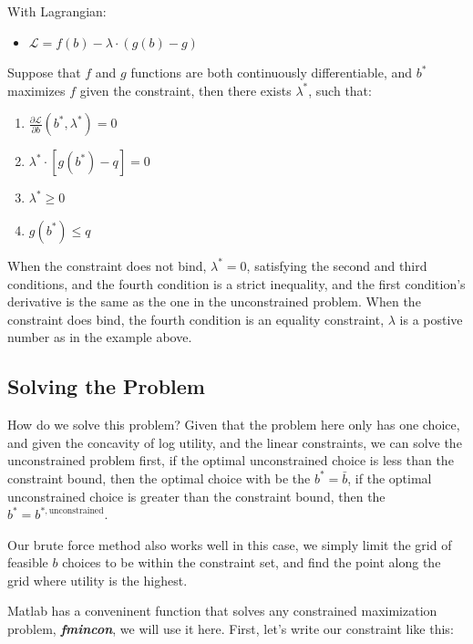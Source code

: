 \documentclass[
]{book}
\providecommand{\tightlist}{%
  \setlength{\itemsep}{0pt}\setlength{\parskip}{0pt}}
\begin{document}
With Lagrangian:

\begin{itemize}
\tightlist
\item
  \(\displaystyle \mathcal{L}=f(b)-\lambda \cdot (g(b)-g)\)
\end{itemize}

Suppose that \(f\) and \(g\) functions are both continuously differentiable,
and \(b^*\) maximizes \(f\) given the constraint, then there exists
\(\lambda^*\), such that:

\begin{enumerate}
\def\labelenumi{\arabic{enumi}.}
\item
  \(\displaystyle \frac{\partial \mathcal{L}}{\partial b}(b^* ,\lambda^* )=0\)
\item
  \(\displaystyle \lambda^* \cdot [g(b^* )-q]=0\)
\item
  \(\displaystyle \lambda^* \ge 0\)
\item
  \(\displaystyle g(b^* )\le q\)
\end{enumerate}

When the constraint does not bind, \(\lambda^* =0\), satisfying the second
and third conditions, and the fourth condition is a strict inequality,
and the first condition's derivative is the same as the one in the
unconstrained problem. When the constraint does bind, the fourth
condition is an equality constraint, \(\lambda\) is a postive number as in
the example above.

\hypertarget{solving-the-problem}{%
\subsection{Solving the Problem}\label{solving-the-problem}}

How do we solve this problem? Given that the problem here only has one
choice, and given the concavity of log utility, and the linear
constraints, we can solve the unconstrained problem first, if the
optimal unconstrained choice is less than the constraint bound, then the
optimal choice with be the \(b^* =\bar{b}\), if the optimal unconstrained
choice is greater than the constraint bound, then the
\(b^* =b^{*,\textrm{unconstrained}}\).

Our brute force method also works well in this case, we simply limit the
grid of feasible \(b\) choices to be within the constraint set, and find
the point along the grid where utility is the highest.

Matlab has a conveninent function that solves any constrained
maximization problem, \textbf{\emph{fmincon}}, we will use it here. First, let's
write our constraint like this:
\end{document}
